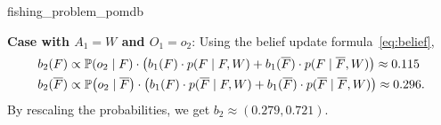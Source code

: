 \begin{solution}{fishing_problem_pomdb}
\begin{enumerate}[beginpenalty=10000]
    \textbf{Case with $A_1 = W$ and $O_1 = o_2$}:
    Using the belief update formula~\eqref{eq:belief}, \begin{align*}
      b_2(F) &\propto \Pr{o_2 \mid F} \cdot \parentheses*{b_1(F) \cdot p(F \mid F, W) + b_1(\overline{F}) \cdot p(F \mid \overline{F}, W)} \approx 0.115 \\
      b_2(\overline{F}) &\propto \Pr{o_2 \mid \overline{F}} \cdot \parentheses*{b_1(F) \cdot p(\overline{F} \mid F, W) + b_1(\overline{F}) \cdot p(\overline{F} \mid \overline{F}, W)} \approx 0.296.
    \end{align*}
    By rescaling the probabilities, we get $b_2 \approx (0.279, 0.721)$.
  \end{enumerate}
\end{solution}

\section*{}

